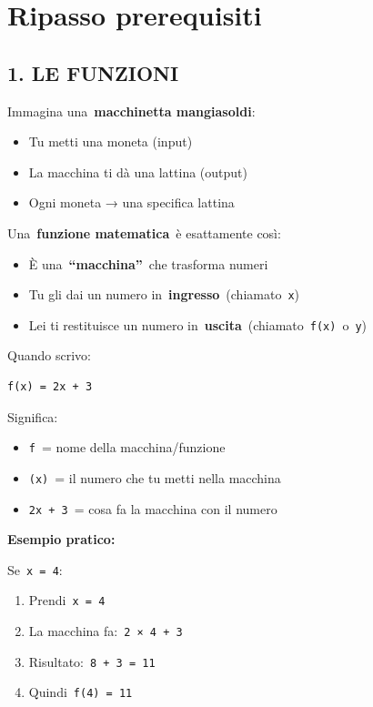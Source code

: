\documentclass[
]{article}
\author{}
\date{}
\providecommand{\tightlist}{%
  \setlength{\itemsep}{0pt}\setlength{\parskip}{0pt}}
\begin{document}
\hypertarget{ripasso-prerequisiti}{%
\section{Ripasso prerequisiti}\label{ripasso-prerequisiti}}

\hypertarget{le-funzioni}{%
\subsection{1. LE FUNZIONI}\label{le-funzioni}}

Immagina una~\textbf{macchinetta mangiasoldi}:

\begin{itemize}
\tightlist
\item
  Tu metti una moneta (input)
\item
  La macchina ti dà una lattina (output)
\item
  Ogni moneta → una specifica lattina
\end{itemize}

Una~\textbf{funzione matematica}~è esattamente così:

\begin{itemize}
\tightlist
\item
  È una~\textbf{``macchina''}~che trasforma numeri
\item
  Tu gli dai un numero in~\textbf{ingresso}~(chiamato~\texttt{x})
\item
  Lei ti restituisce un numero in~\textbf{uscita}~(chiamato~\texttt{f(x)}~o~\texttt{y})
\end{itemize}

Quando scrivo:

\begin{verbatim}
f(x) = 2x + 3
\end{verbatim}

Significa:

\begin{itemize}
\tightlist
\item
  \texttt{f}~= nome della macchina/funzione
\item
  \texttt{(x)}~= il numero che tu metti nella macchina
\item
  \texttt{2x\ +\ 3}~= cosa fa la macchina con il numero
\end{itemize}

\textbf{Esempio pratico:}

Se~\texttt{x\ =\ 4}:

\begin{enumerate}
\def\labelenumi{\arabic{enumi}.}
\tightlist
\item
  Prendi~\texttt{x\ =\ 4}
\item
  La macchina fa:~\texttt{2\ ×\ 4\ +\ 3}
\item
  Risultato:~\texttt{8\ +\ 3\ =\ 11}
\item
  Quindi~\texttt{f(4)\ =\ 11}
\end{enumerate}
\end{document}
